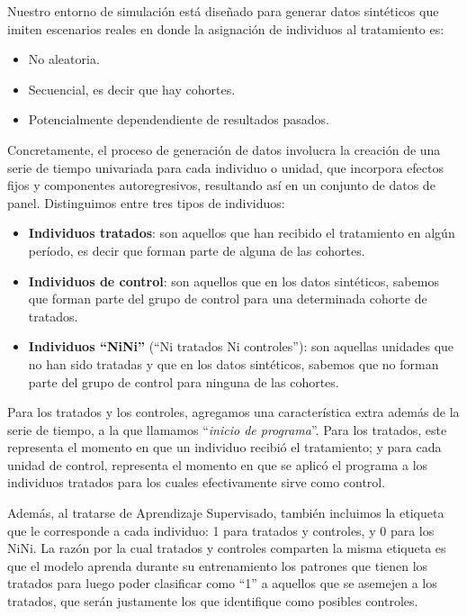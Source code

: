 \documentclass[../../main.tex]{subfiles}
\begin{document}
Nuestro entorno de simulación está diseñado para generar datos sintéticos que imiten
escenarios reales en donde la asignación de individuos al tratamiento es:
\begin{itemize}[itemsep=0.05cm]
    \item No aleatoria.
    \item Secuencial, es decir que hay cohortes.
    \item Potencialmente dependendiente de resultados pasados.
\end{itemize}

Concretamente, el proceso de generación de datos involucra la creación de una serie de
tiempo univariada para cada individuo o unidad, que incorpora efectos fijos y componentes
autoregresivos, resultando así en un conjunto de datos de panel. Distinguimos entre tres
tipos de individuos:
\begin{itemize}[itemsep=0.1cm]
    \item \textbf{Individuos tratados}: son aquellos que han recibido el tratamiento en
    algún período, es decir que forman parte de alguna de las cohortes.
    \item \textbf{Individuos de control}: son aquellos que en los datos sintéticos,
    sabemos que forman parte del grupo de control para una determinada cohorte de
    tratados.
    \item \textbf{Individuos ``NiNi''} (``Ni tratados Ni controles''): son aquellas
    unidades que no han sido tratadas y que en los datos sintéticos, sabemos que no forman
    parte del grupo de control para ninguna de las cohortes.
\end{itemize}

Para los tratados y los controles, agregamos una característica extra además de la serie
de tiempo, a la que llamamos ``\textit{inicio de programa}''. Para los tratados, este
representa el momento en que un individuo recibió el tratamiento; y para cada unidad de
control, representa el momento en que se aplicó el programa a los individuos tratados para
los cuales efectivamente sirve como control.

Además, al tratarse de Aprendizaje Supervisado, también incluimos la etiqueta que le
corresponde a cada individuo: 1 para tratados y controles, y 0 para los NiNi. La razón por
la cual tratados y controles comparten la misma etiqueta es que el modelo aprenda durante
su entrenamiento los patrones que tienen los tratados para luego poder clasificar como
``1'' a aquellos que se asemejen a los tratados, que serán justamente los que identifique
como posibles controles.
\end{document}
